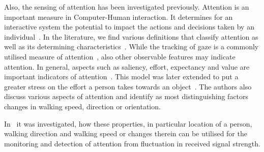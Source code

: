 \documentclass[12pt]{article}
\makeatletter
\renewcommand\paragraph{\@startsection{paragraph}{4}{\z@}%
  {-3.25ex\@plus -1ex \@minus -.2ex}%
  {1.5ex \@plus .2ex}%
  {\normalfont\normalsize\bfseries}}
\makeatother
\begin{document}
Also, the sensing of attention has been investigated previously. 
Attention is an important measure in Computer-Human interaction. 
It determines for an interactive system the potential to impact the actions and decisions taken by an individual~\cite{AttentionMonitoring_Xu_2012}.
In the literature, we find various definitions that classify attention as well as its determining characteristics~\cite{AttentionMonitoring_Wu_2007, AttentionMonitoring_Wickens_1984}.
While the tracking of gaze is a commonly utilised measure of attention~\cite{AttentionMonitoring_Yonezawa_2007}, also other observable features may indicate attention. 
In general, aspects such as saliency, effort, expectancy and value are important indicators of attention~\cite{AttentionMonitoring_Wickens_2008, AttentionMonitoring_Wickens_1984,AttentionMonitoring_Xu_2012,AttentionMonitoring_Gollan_2011}.
This model was later extended to put a greater stress on the effort a person takes towards an object~\cite{AttentionMonitoring_Ferscha_2012}.
The authors also discuss various aspects of attention and identify as most distinguishing factors changes in walking speed, direction or orientation.

In~\cite{Pervasive_Shi_2014} it was investigated, how these properties, in particular location of a person, walking direction and walking speed or changes therein can be utilised for the monitoring and detection of attention from fluctuation in received signal strength. 
\end{document}
